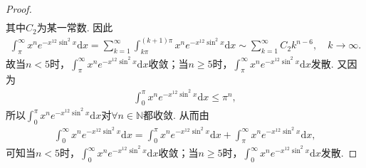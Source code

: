 \documentclass[../../main.tex]{subfiles}
\begin{document}
\begin{proof}
\begin{align*}
\end{align*}
其中$C_2$为某一常数. 因此
\begin{align*}
\int_{\pi}^{\infty}x^ne^{-x^{12}\sin^2x}\mathrm{d}x=\sum_{k=1}^{\infty}\int_{k\pi}^{(k+1)\pi}x^ne^{-x^{12}\sin^2x}\mathrm{d}x\sim \sum_{k=1}^{\infty}C_2k^{n-6},\quad k\rightarrow \infty.
\end{align*}
故当$n<5$时，$\int_{\pi}^{\infty}x^ne^{-x^{12}\sin^2x}\mathrm{d}x$收敛；当$n\geqslant 5$时，$\int_{\pi}^{\infty}x^ne^{-x^{12}\sin^2x}\mathrm{d}x$发散. 又因为
\begin{align*}
\int_0^{\pi}x^ne^{-x^{12}\sin^2x}\mathrm{d}x\leqslant \pi^n,
\end{align*}
所以$\int_0^{\pi}x^ne^{-x^{12}\sin^2x}\mathrm{d}x$对$\forall n\in \mathbb{N}$都收敛. 从而由
\begin{align*}
\int_0^{\infty}x^ne^{-x^{12}\sin^2x}\mathrm{d}x=\int_0^{\pi}x^ne^{-x^{12}\sin^2x}\mathrm{d}x+\int_{\pi}^{\infty}x^ne^{-x^{12}\sin^2x}\mathrm{d}x,
\end{align*}
可知当$n<5$时，$\int_0^{\infty}x^ne^{-x^{12}\sin^2x}\mathrm{d}x$收敛；当$n\geqslant 5$时，$\int_0^{\infty}x^ne^{-x^{12}\sin^2x}\mathrm{d}x$发散.

\end{proof}
\end{document}
